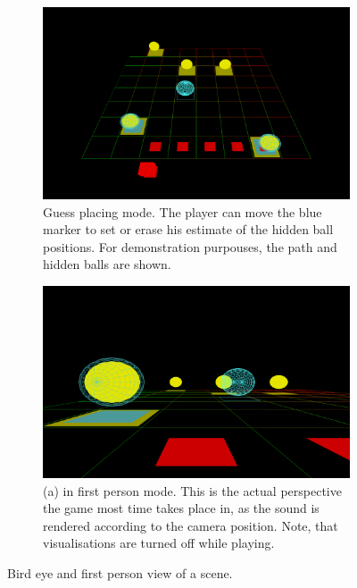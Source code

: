 \documentclass[conference]{IEEEtran}
\begin{document}
% 
% 
\begin{figure}[t]
    \centering
    \begin{subfigure}[t]{0.48\linewidth}
        \centering
        \includegraphics[width=\textwidth]{img/gameplay2.png}
        \vspace{-1em}
        \caption{Guess placing mode. The player can move the blue marker to set or erase his estimate of the hidden ball positions. For demonstration purpouses, the path and hidden balls are shown.}
        \label{fig:tpv}
    \end{subfigure}
    \hfill
    \begin{subfigure}[t]{0.48\linewidth}
        \centering
        \includegraphics[width=\linewidth]{img/gameplay3.png}
        \vspace{-1em}
        \caption{(a) in first person mode. This is the actual perspective the game most time takes place in, as the sound is rendered according to the camera position. Note, that visualisations are turned off while playing.}
        \label{fig:fpv}
    \end{subfigure}
    \vspace{-1em}
    \caption{Bird eye and first person view of a scene.}
    \label{fig:views}
    \vspace{-1em}
\end{figure}
% 
% 
\end{document}
